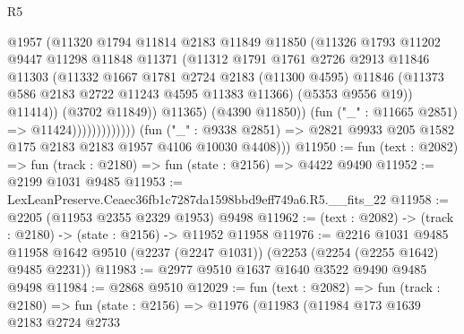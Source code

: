 \begin{lexlean}{R5}
\begin{coremodule}
                                    @1957
                                    (@11320
                                      @1794
                                      @11814
                                      @2183
                                      @11849
                                      @11850
                                      (@11326
                                        @1793
                                        @11202
                                        @9447
                                        @11298
                                        @11848
                                        @11371
                                        (@11312
                                          @1791
                                          @1761
                                          @2726
                                          @2913
                                          @11846
                                          @11303
                                          (@11332
                                            @1667
                                            @1781
                                            @2724
                                            @2183
                                            (@11300 @4595)
                                            @11846
                                            (@11373 @586 @2183 @2722 @11243 @4595 @11383 @11366)
                                            (@5353 @9556 @19))
                                          @11414))
                                      (@3702 @11849))
                                    @11365)
                                  (@4390 @11850))
                                (fun ("_" : @11665 @2851) => @11424)))))))))))))
        (fun ("_" : @9338 @2851) =>
        @2821 @9933 @205 @1582 @175 @2183 @2183 @1957 @4106 @10030 @4408)))
@11950 := fun (text : @2082) => fun (track : @2180) => fun (state : @2156) => @4422 @9490
@11952 := @2199 @1031 @9485
@11953 := LexLeanPreserve.Ceaec36fb1c7287da1598bbd9eff749a6.R5.__fits_22
@11958 := @2205 (@11953 @2355 @2329 @1953) @9498
@11962 := (text : @2082) -> (track : @2180) -> (state : @2156) -> @11952 @11958
@11976 := @2216
    @1031
    @9485
    @11958
    @1642
    @9510
    (@2237 (@2247 @1031))
    (@2253 (@2254 (@2255 @1642) @9485 @2231))
@11983 := @2977 @9510 @1637 @1640 @3522 @9490 @9485 @9498
@11984 := @2868 @9510
@12029 := fun (text : @2082) =>
  fun (track : @2180) =>
  fun (state : @2156) =>
  @11976
    (@11983
      (@11984
        @173
        @1639
        @2183
        @2724
        @2733

\end{coremodule}
\end{lexlean}
